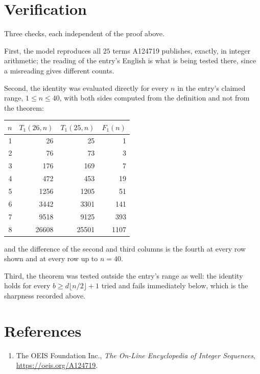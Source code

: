 \documentclass[11pt,a4paper]{article}
\theoremstyle{plain}
\theoremstyle{definition}
\begin{document}
\section{Verification}

Three checks, each independent of the proof above.

First, the model reproduces all $25$ terms A124719 publishes, exactly, in integer
arithmetic; the reading of the entry's English is what is being tested there, since a
misreading gives different counts.

Second, the identity was evaluated directly for every $n$ in the entry's claimed range,
$1\le n\le40$, with both sides computed from the definition and not from the theorem:

\begin{center}
\begin{tabular}{rrrr}
$n$ & $T_{1}(26,n)$ & $T_{1}(25,n)$ & $F_{1}(n)$ \\ \hline
1 & 26 & 25 & 1 \\
2 & 76 & 73 & 3 \\
3 & 176 & 169 & 7 \\
4 & 472 & 453 & 19 \\
5 & 1256 & 1205 & 51 \\
6 & 3442 & 3301 & 141 \\
7 & 9518 & 9125 & 393 \\
8 & 26608 & 25501 & 1107 \\
\end{tabular}
\end{center}

\noindent and the difference of the second and third columns is the fourth at every row shown
and at every row up to $n=40$.

Third, the theorem was tested outside the entry's range as well: the identity holds for every
$b\ge d\lfloor n/2\rfloor+1$ tried and fails immediately below, which is the sharpness recorded
above.

\section*{References}
\begin{enumerate}
\item The OEIS Foundation Inc., \emph{The On-Line Encyclopedia of Integer Sequences},
\url{https://oeis.org/A124719}.
\end{enumerate}
\end{document}
